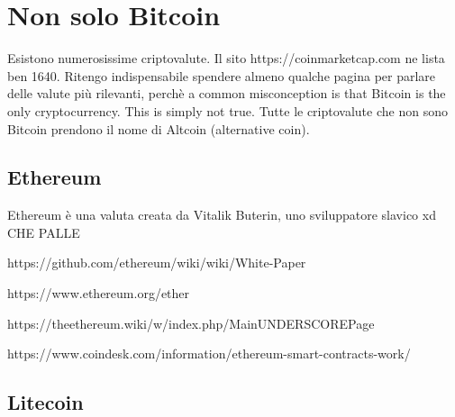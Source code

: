 \documentclass {article}
\begin{document}
\section {Non solo Bitcoin}


Esistono numerosissime criptovalute. Il sito https://coinmarketcap.com ne lista ben 1640. Ritengo indispensabile spendere almeno qualche pagina per parlare delle valute più rilevanti, perchè a common misconception is that Bitcoin is the only cryptocurrency. This is simply not true. Tutte le criptovalute che non sono Bitcoin prendono il nome di Altcoin (alternative coin).


\subsection {Ethereum}


Ethereum è una valuta creata da Vitalik Buterin, uno sviluppatore slavico xd CHE PALLE

https://github.com/ethereum/wiki/wiki/White-Paper

https://www.ethereum.org/ether

https://theethereum.wiki/w/index.php/MainUNDERSCOREPage

https://www.coindesk.com/information/ethereum-smart-contracts-work/


\subsection {Litecoin}
\end{document}

